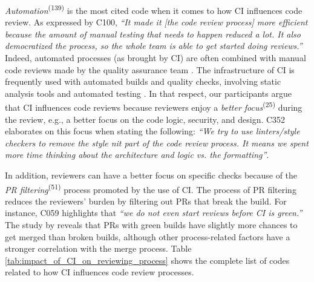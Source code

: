 	\textit{Automation}\textsuperscript{(139)} is the most cited code when it comes to how CI influences code review. As expressed by C100, \textit{``It made it [the code review process] more efficient because the amount of manual testing that needs to happen reduced a lot. It also democratized the process, so the whole team is able to get started doing reviews.''} 
	Indeed, automated processes (as brought by CI) are often combined with manual code reviews made by the quality assurance team \citep{rahman2017impact}. The infrastructure of CI is frequently used with automated builds and quality checks, involving static analysis tools and automated testing  \citep{zampetti2019study}. In that respect, our participants argue that CI influences code reviews because reviewers enjoy a \textit{better focus}\textsuperscript{(25)} during the review, e.g., a better focus on the code logic, security, and design. C352 elaborates on this focus when stating the following: \textit{``We try to use linters/style checkers to remove the style nit part of the code review process. It means we spent more time thinking about the architecture and logic vs. the formatting''}.

	In addition, reviewers can have a better focus on specific checks because of the \textit{PR filtering}\textsuperscript{(51)} process promoted by the use of CI. The process of PR filtering reduces the reviewers' burden by filtering out PRs that break the build. For instance, 
	C059 highlights that \textit{``we do not even start reviews before CI is green.''} The study by \cite{zampetti2019study} reveals that PRs with green builds have slightly more chances to get merged than broken builds, although other process-related factors have a stronger correlation with the merge process. Table \ref{tab:impact_of_CI_on_reviewing_process} shows the complete list of codes related to how CI influences code review processes.

